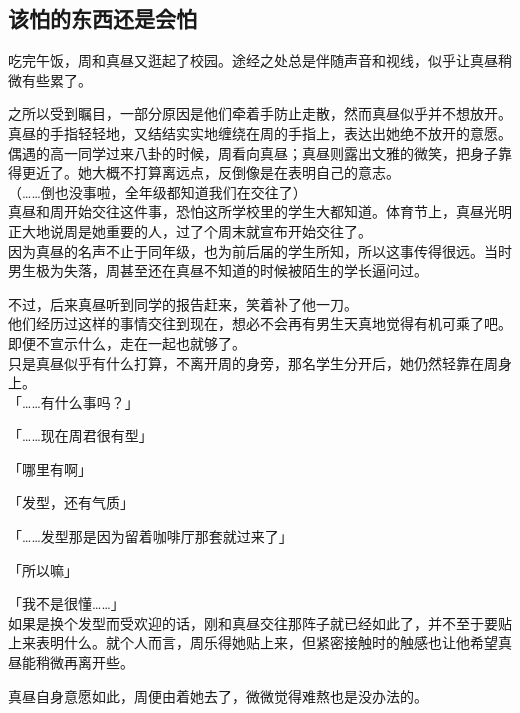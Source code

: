 \subsection{该怕的东西还是会怕}

吃完午饭，周和真昼又逛起了校园。途经之处总是伴随声音和视线，似乎让真昼稍微有些累了。

之所以受到瞩目，一部分原因是他们牵着手防止走散，然而真昼似乎并不想放开。真昼的手指轻轻地，又结结实实地缠绕在周的手指上，表达出她绝不放开的意愿。\\

偶遇的高一同学过来八卦的时候，周看向真昼；真昼则露出文雅的微笑，把身子靠得更近了。她大概不打算离远点，反倒像是在表明自己的意志。\\

（……倒也没事啦，全年级都知道我们在交往了）\\

真昼和周开始交往这件事，恐怕这所学校里的学生大都知道。体育节上，真昼光明正大地说周是她重要的人，过了个周末就宣布开始交往了。\\

因为真昼的名声不止于同年级，也为前后届的学生所知，所以这事传得很远。当时男生极为失落，周甚至还在真昼不知道的时候被陌生的学长逼问过。

不过，后来真昼听到同学的报告赶来，笑着补了他一刀。\\

他们经历过这样的事情交往到现在，想必不会再有男生天真地觉得有机可乘了吧。即便不宣示什么，走在一起也就够了。\\

只是真昼似乎有什么打算，不离开周的身旁，那名学生分开后，她仍然轻靠在周身上。\\

「……有什么事吗？」

「……现在周君很有型」

「哪里有啊」

「发型，还有气质」

「……发型那是因为留着咖啡厅那套就过来了」

「所以嘛」

「我不是很懂……」\\

如果是换个发型而受欢迎的话，刚和真昼交往那阵子就已经如此了，并不至于要贴上来表明什么。就个人而言，周乐得她贴上来，但紧密接触时的触感也让他希望真昼能稍微再离开些。

真昼自身意愿如此，周便由着她去了，微微觉得难熬也是没办法的。\\

